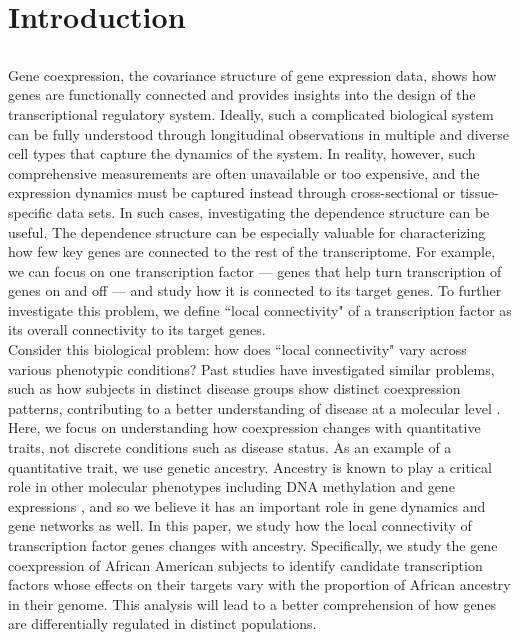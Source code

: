 \documentclass[aoas,preprint]{imsart}
\numberwithin{equation}{section}
\theoremstyle{plain}
\begin{document}
\section{Introduction}
\subsection*{}
Gene coexpression, the covariance structure of gene expression data, shows how genes are functionally connected and provides insights into the design of the transcriptional regulatory system. Ideally, such a complicated biological system can be fully understood through longitudinal observations in multiple and diverse cell types that capture the dynamics of the system. In reality, however, such comprehensive measurements are often unavailable or too expensive, and the expression dynamics must be captured instead through cross-sectional or tissue-specific data sets. In such cases, investigating the dependence structure can be useful. The dependence structure can be especially valuable for characterizing how few key genes are connected to the rest of the transcriptome. For example, we can focus on one transcription factor --- genes that help turn transcription of genes on and off --- and study how it is connected to its target genes. To further investigate this problem, we define ``local connectivity" of a transcription factor as its overall connectivity to its target genes.\\

Consider this biological problem: how does ``local connectivity" vary across various phenotypic conditions?  Past studies have investigated similar problems, such as how subjects in distinct disease groups show distinct coexpression patterns, contributing to a better understanding of disease at a molecular level \cite{de2010differential}. Here, we focus on understanding how coexpression changes with quantitative traits, not discrete conditions such as disease status. As an example of a quantitative trait, we use genetic ancestry. Ancestry is known to play a critical role in other molecular phenotypes including DNA methylation and gene expressions \cite{galanter2017differential, price2008effects}, and so we believe it has an important role in gene dynamics and gene networks as well. In this paper, we study how the local connectivity of transcription factor genes changes with ancestry. Specifically, we study the gene coexpression of African American subjects to identify candidate transcription factors whose effects on their targets vary with the proportion of African ancestry in their genome. This analysis will lead to a better comprehension of how genes are differentially regulated in distinct populations. \\
\end{document}
